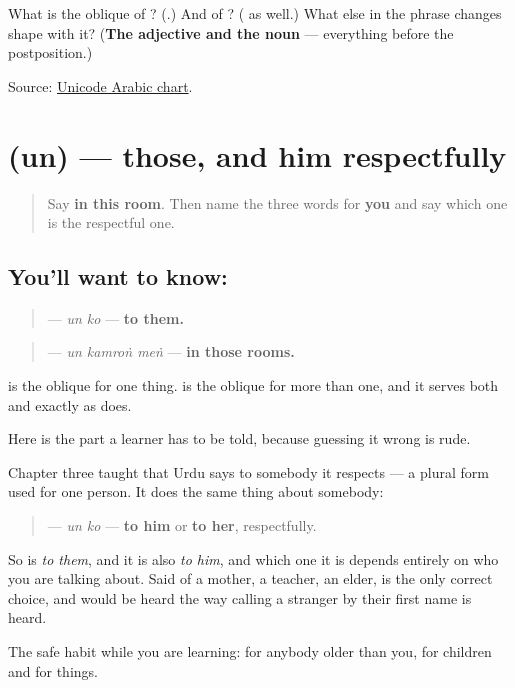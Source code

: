 \begin{tcolorbox}[breakable,colback=teal!4,colframe=teal!35!black,title={Before you move on}]
What is the oblique of \textbf{}? (\textbf{}.) And of \textbf{}? (\textbf{} as well.) What else in the phrase changes shape with it? (\textbf{The adjective and the noun} — everything before the postposition.)

Source: \href{https://www.unicode.org/charts/PDF/U0600.pdf}{Unicode Arabic chart}.
\end{tcolorbox}
\section[\texorpdfstring{\ur{ان} (un)}{ان (un)}]{ (un) — those, and him respectfully}

\label{lesson:UR-C24-un}



\begin{quote}
Say \textbf{in this room}. Then name the three words for \textbf{you} and say which one is the respectful one.
\end{quote}

\subsection*{You'll want to know: }
\begin{quote}
\textbf{ } — \emph{un ko} — \textbf{to them.}
\end{quote}

\begin{quote}
\textbf{  } — \emph{un kamroṅ meṅ} — \textbf{in those rooms.}
\end{quote}

\textbf{} is the oblique for one thing. \textbf{} is the oblique for more than one, and it serves both \textbf{} and \textbf{} exactly as \textbf{} does.

\begin{grammarlens}[title={Grammar Lens: a plural that is not about number}]
Here is the part a learner has to be told, because guessing it wrong is rude.

Chapter three taught that Urdu says \textbf{} to somebody it respects — a plural form used for one person. It does the same thing about somebody:

\begin{quote}
\textbf{ } — \emph{un ko} — \textbf{to him} or \textbf{to her}, respectfully.
\end{quote}

So \textbf{ } is \emph{to them}, and it is also \emph{to him}, and which one it is depends entirely on who you are talking about. Said of a mother, a teacher, an elder, \textbf{} is the only correct choice, and \textbf{} would be heard the way calling a stranger by their first name is heard.

The safe habit while you are learning: \textbf{} for anybody older than you, \textbf{} for children and for things.
\end{grammarlens}

